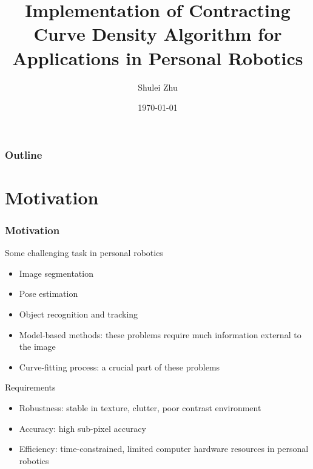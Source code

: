 \documentclass[english,10pt,presentation]{beamer}
\title{Implementation of Contracting Curve Density Algorithm for Applications in Personal Robotics}
\author{Shulei Zhu}
\date{\today}
\begin{document}
\maketitle

\begin{frame}
\frametitle{Outline}
\setcounter{tocdepth}{2}
\tableofcontents
\end{frame}
\section{Motivation}
\label{sec-1}
\begin{frame}
\frametitle{Motivation}
\label{sec-1_1}
\begin{alertblock}{Some challenging task in personal robotics}
\label{sec-1_1_1}
\begin{itemize}

\item Image segmentation\\
\label{sec-1_1_1_1}%
\item Pose estimation\\
\label{sec-1_1_1_2}%
\item Object recognition and tracking\\
\label{sec-1_1_1_3}%
\end{itemize} %
\end{alertblock}
\begin{itemize}

\item Model-based methods: these problems require much information external to the image\\
\label{sec-1_1_2}%
\item Curve-fitting process: a crucial part of these problems\\
\label{sec-1_1_3}%
\end{itemize} %
\begin{exampleblock}{Requirements}
\label{sec-1_1_4}
\begin{itemize}

\item Robustness: stable in texture, clutter, poor contrast environment\\
\label{sec-1_1_4_1}%
\item Accuracy: high sub-pixel accuracy\\
\label{sec-1_1_4_2}%
\item Efficiency: time-constrained, limited computer hardware resources in personal robotics\\
\label{sec-1_1_4_3}%
\end{itemize} %
\end{exampleblock}
\end{frame}
\end{document}
